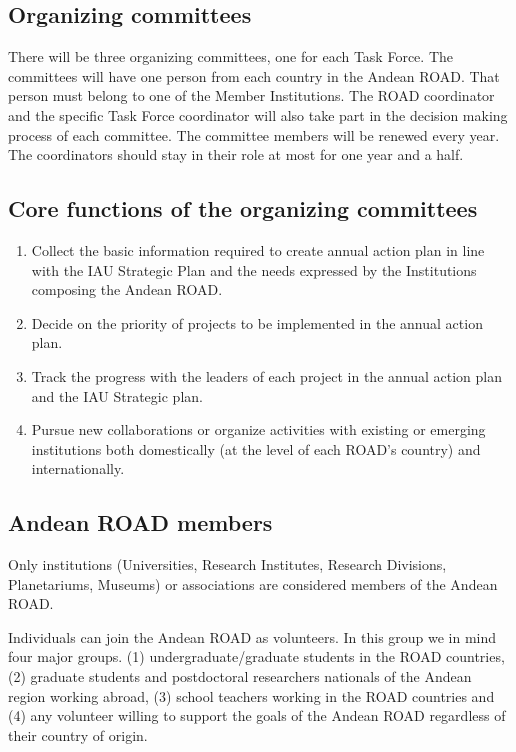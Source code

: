 \documentclass[12pt]{article}
\begin{document}
\subsection*{Organizing committees}


There will be three organizing committees, one for each Task
Force. The committees will have one person from each country in the
Andean ROAD. That person must belong to one of the Member
Institutions. The ROAD coordinator and the specific Task Force
coordinator will also take part in the decision making process of each
committee. The committee members will be renewed every year. The
coordinators should stay in their role at most for one year and a
half. 

\subsection*{Core functions of the organizing committees}
\begin{enumerate}
\item Collect the basic information required to create annual action
  plan in line with the IAU Strategic Plan and the needs expressed by
  the Institutions composing the Andean ROAD. 
\item Decide on the priority of projects to be implemented in the
  annual action plan. 
\item Track the progress with the leaders of each project in the
  annual action plan and the IAU Strategic plan. 
\item Pursue new collaborations or organize activities with existing
  or emerging institutions both domestically (at the level of each
  ROAD’s country) and internationally. 
 \end{enumerate}

\subsection*{Andean ROAD members}


Only institutions (Universities, Research Institutes, Research
Divisions, Planetariums, Museums) or associations are considered
members of the Andean ROAD. 


Individuals can join the Andean ROAD as volunteers. In this group we
in mind four major groups. (1) undergraduate/graduate students in the
ROAD countries, (2) graduate students and postdoctoral researchers
nationals of the Andean region working abroad, (3) school teachers
working in the ROAD countries and (4) any volunteer willing to support
the goals of the Andean ROAD regardless of their country of origin. 
\end{document}
